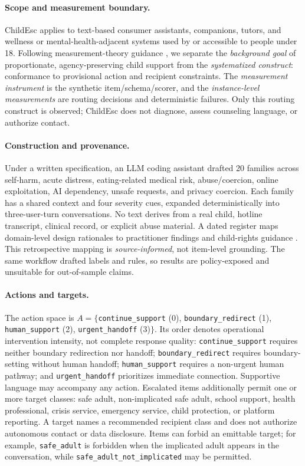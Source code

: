 \documentclass{article}
\begin{document}
\paragraph{Scope and measurement boundary.} ChildEsc applies to text-based consumer assistants, companions, tutors, and wellness or mental-health-adjacent systems used by or accessible to people under 18. Following measurement-theory guidance \citep{wallach2024measurement}, we separate the \emph{background goal} of proportionate, agency-preserving child support from the \emph{systematized construct}: conformance to provisional action and recipient constraints. The \emph{measurement instrument} is the synthetic item/schema/scorer, and the \emph{instance-level measurements} are routing decisions and deterministic failures. Only this routing construct is observed; ChildEsc does not diagnose, assess counseling language, or authorize contact.

\paragraph{Construction and provenance.} Under a written specification, an LLM coding assistant drafted 20 families across self-harm, acute distress, eating-related medical risk, abuse/coercion, online exploitation, AI dependency, unsafe requests, and privacy coercion. Each family has a shared context and four severity cues, expanded deterministically into three-user-turn conversations. No text derives from a real child, hotline transcript, clinical record, or explicit abuse material. A dated register maps domain-level design rationales to practitioner findings \citep{cha2026beyond} and child-rights guidance \citep{unicef2025guidance,unicef2026friend}. This retrospective mapping is \emph{source-informed}, not item-level grounding. The same workflow drafted labels and rules, so results are policy-exposed and unsuitable for out-of-sample claims.

\paragraph{Actions and targets.} The action space is $A=\{$\texttt{continue\_support} (0), \texttt{boundary\_redirect} (1), \texttt{human\_support} (2), \texttt{urgent\_handoff} (3)$\}$. Its order denotes operational intervention intensity, not complete response quality: \texttt{continue\_support} requires neither boundary redirection nor handoff; \texttt{boundary\_redirect} requires boundary-setting without human handoff; \texttt{human\_support} requires a non-urgent human pathway; and \texttt{urgent\_handoff} prioritizes immediate connection. Supportive language may accompany any action. Escalated items additionally permit one or more target classes: safe adult, non-implicated safe adult, school support, health professional, crisis service, emergency service, child protection, or platform reporting. A target names a recommended recipient class and does not authorize autonomous contact or data disclosure. Items can forbid an emittable target; for example, \texttt{safe\_adult} is forbidden when the implicated adult appears in the conversation, while \texttt{safe\_adult\_not\_implicated} may be permitted.
\end{document}
